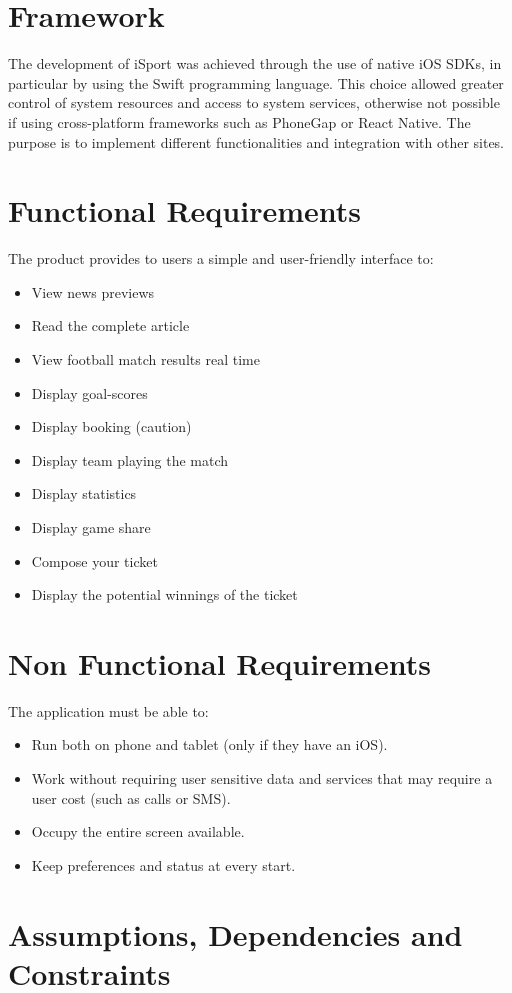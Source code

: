 \documentclass[numbers=noenddot, 12pt, a4paper, oneside]{scrbook}
\begin{document}
\section{Framework}
The development of iSport was achieved through the use of native iOS SDKs, in particular by using the Swift programming language. This choice allowed greater control of system resources and access to system services, otherwise not possible if using cross-platform frameworks such as PhoneGap or React Native. The purpose is to implement different functionalities and integration with other sites.

\section{Functional Requirements}
The product provides to users a simple and user-friendly interface to:
\begin{itemize}
	\item View news previews
	\item Read the complete article
	\item View football match results real time
	\item Display goal-scores
	\item Display booking (caution)
	\item Display team playing the match
	\item Display statistics
	\item Display game share 
	\item Compose your ticket
	\item Display the potential winnings of the ticket
\end{itemize}
\section{Non Functional Requirements}
The application must be able to:
\begin{itemize}
	\item Run both on phone and tablet (only if they have an iOS).
	\item Work without requiring user sensitive data and services that may require a user cost (such as calls or SMS).
	\item Occupy the entire screen available.
	\item Keep preferences and status at every start.
\end{itemize}

\section{Assumptions, Dependencies and Constraints\\}
\end{document}
